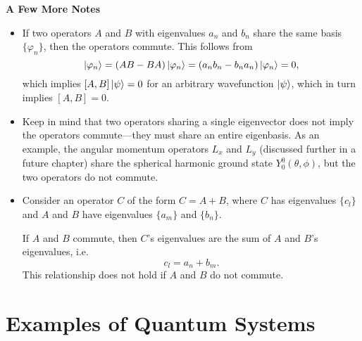 \documentclass[11pt, a4paper]{article}
\begin{document}
\textbf{A Few More Notes}
\begin{itemize}
    \item If two operators $ A $ and $ B $ with eigenvalues $ a_{n} $ and $ b_{n} $ share the same basis $ \{\varphi_{n}\} $, then the operators commute. This follows from
    \begin{equation*}
        [A, B] \ket{\varphi_{n}} = (AB - BA)\ket{\varphi_{n}} = (a_{n}b_{n} - b_{n}a_{n})\ket{\varphi_{n}} = 0,
    \end{equation*}
    which implies $ [A, B] \ket{\psi} = 0 $ for an arbitrary wavefunction $ \ket{\psi} $, which in turn implies $ [A, B] = 0 $.

    \item Keep in mind that two operators sharing a single eigenvector does not imply the operators commute---they must share an entire eigenbasis. As an example, the angular momentum operators $ L_{x} $ and $ L_{y} $ (discussed further in a future chapter) share the spherical harmonic ground state $ Y_{0}^{0}(\theta, \phi) $, but the two operators do not commute.

    \item Consider an operator $ C $ of the form $ C = A + B $, where $ C $ has eigenvalues $ \{c_{l}\} $ and $ A $ and $ B $ have eigenvalues $ \{a_{m}\} $ and $ \{b_{n}\} $. 

    If $ A $ and $ B $ commute, then $ C $'s eigenvalues are the sum of $ A $ and $ B $'s eigenvalues, i.e.
    \begin{equation*}
        c_{l} = a_{n} + b_{m}.
    \end{equation*}
    This relationship does not hold if $ A $ and $ B $ do not commute.
    
\end{itemize}

\newpage
\section{Examples of Quantum Systems}
\end{document}
